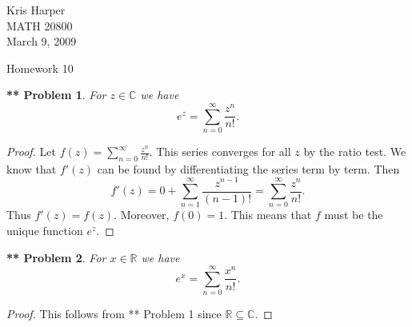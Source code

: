 \documentclass{article}
\newtheorem{**}{** Problem}
\begin{document}
\begin{flushright}
Kris Harper\\

MATH 20800\\

March 9, 2009
\end{flushright}

\begin{center}
Homework 10
\end{center}

\begin{flushleft}

\begin{**}
For $z \in \mathbb{C}$ we have
\[
e^z = \sum_{n=0}^{\infty} \frac{z^n}{n!}.
\]
\end{**}
\begin{proof}
Let $f(z) = \sum_{n=0}^{\infty} \frac{z^n}{n!}$. This series converges for all $z$ by the ratio test. We know that $f'(z)$ can be found by differentiating the series term by term. Then
\[
f'(z) = 0 + \sum_{n=1}^{\infty} \frac{z^{n-1}}{(n-1)!} = \sum_{n=0}^{\infty} \frac{z^n}{n!}.
\]
Thus $f'(z) = f(z)$. Moreover, $f(0) = 1$. This means that $f$ must be the unique function $e^z$.
\end{proof}

\begin{**}
For $x \in \mathbb{R}$ we have
\[
e^x = \sum_{n=0}^{\infty} \frac{x^n}{n!}.
\]
\end{**}
\begin{proof}
This follows from ** Problem 1 since $\mathbb{R} \subseteq \mathbb{C}$.
\end{proof}


\end{flushleft}
\end{document}
